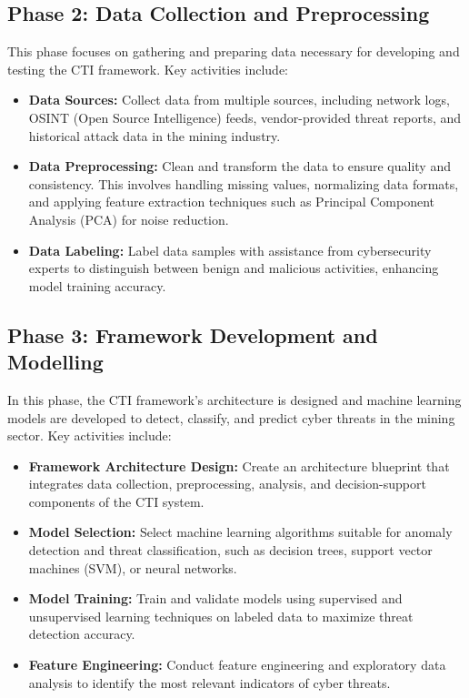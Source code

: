 \documentclass[a4paper,twoside,12pt]{report}
\begin{document}
\subsection{Phase 2: Data Collection and Preprocessing}
This phase focuses on gathering and preparing data necessary for developing and testing the CTI framework. Key activities include:
\begin{itemize}
    \item \textbf{Data Sources:} Collect data from multiple sources, including network logs, OSINT (Open Source Intelligence) feeds, vendor-provided threat reports, and historical attack data in the mining industry.
    \item \textbf{Data Preprocessing:} Clean and transform the data to ensure quality and consistency. This involves handling missing values, normalizing data formats, and applying feature extraction techniques such as Principal Component Analysis (PCA) for noise reduction.
    \item \textbf{Data Labeling:} Label data samples with assistance from cybersecurity experts to distinguish between benign and malicious activities, enhancing model training accuracy.
\end{itemize}

\subsection{Phase 3: Framework Development and Modelling}
In this phase, the CTI framework’s architecture is designed and machine learning models are developed to detect, classify, and predict cyber threats in the mining sector. Key activities include:
\begin{itemize}
    \item \textbf{Framework Architecture Design:} Create an architecture blueprint that integrates data collection, preprocessing, analysis, and decision-support components of the CTI system.
    \item \textbf{Model Selection:} Select machine learning algorithms suitable for anomaly detection and threat classification, such as decision trees, support vector machines (SVM), or neural networks.
    \item \textbf{Model Training:} Train and validate models using supervised and unsupervised learning techniques on labeled data to maximize threat detection accuracy.
    \item \textbf{Feature Engineering:} Conduct feature engineering and exploratory data analysis to identify the most relevant indicators of cyber threats.
\end{itemize}
\end{document}
